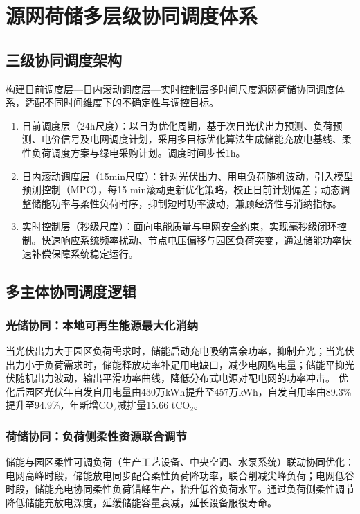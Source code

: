 \documentclass[12pt,a4paper]{article}
\begin{document}
\section{源网荷储多层级协同调度体系}
\subsection{三级协同调度架构}
构建日前调度层—日内滚动调度层—实时控制层多时间尺度源网荷储协同调度体系，适配不同时间维度下的不确定性与调控目标。
\begin{enumerate}
    \item 日前调度层（24h尺度）：以日为优化周期，基于次日光伏出力预测、负荷预测、电价信号及电网调度计划，采用多目标优化算法生成储能充放电基线、柔性负荷调度方案与绿电采购计划。调度时间步长1h。
    \item 日内滚动调度层（15min尺度）：针对光伏出力、用电负荷随机波动，引入模型预测控制（MPC），每15 min滚动更新优化策略，校正日前计划偏差；动态调整储能功率与柔性负荷时序，抑制短时功率波动，兼顾经济性与消纳指标。
    \item 实时控制层（秒级尺度）：面向电能质量与电网安全约束，实现毫秒级闭环控制。快速响应系统频率扰动、节点电压偏移与园区负荷突变，通过储能功率快速补偿保障系统稳定运行。
\end{enumerate}

\subsection{多主体协同调度逻辑}
\subsubsection{光储协同：本地可再生能源最大化消纳}
当光伏出力大于园区负荷需求时，储能启动充电吸纳富余功率，抑制弃光；当光伏出力小于负荷需求时，储能释放功率补足用电缺口，减少电网购电量；储能平抑光伏随机出力波动，输出平滑功率曲线，降低分布式电源对配电网的功率冲击。
优化后园区光伏年自发自用电量由430万kWh提升至457万kWh，自发自用率由89.3\%提升至94.9\%，年新增CO$_2$减排量15.66 tCO$_2$。

\subsubsection{荷储协同：负荷侧柔性资源联合调节}
储能与园区柔性可调负荷（生产工艺设备、中央空调、水泵系统）联动协同优化：电网高峰时段，储能放电同步配合柔性负荷降功率，联合削减尖峰负荷；电网低谷时段，储能充电协同柔性负荷错峰生产，抬升低谷负荷水平。通过负荷侧柔性调节降低储能充放电深度，延缓储能容量衰减，延长设备服役寿命。
\end{document}
